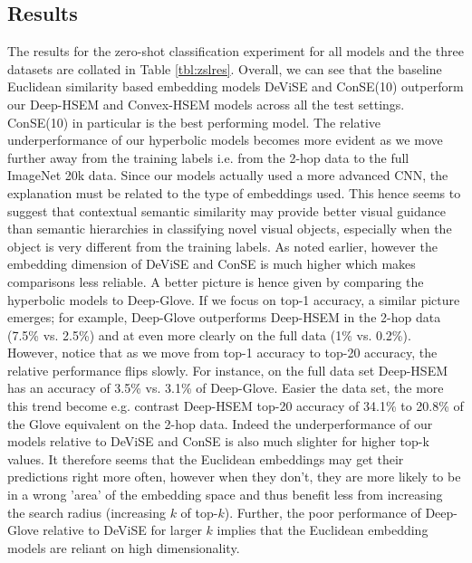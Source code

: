 \documentclass[12pt]{report}
\begin{document}
\subsection{Results}
The results for the zero-shot classification experiment for all models and the three datasets are collated in Table \ref{tbl:zslres}. Overall, we can see that the baseline Euclidean similarity based embedding models DeViSE and ConSE(10) outperform our Deep-HSEM and Convex-HSEM models across all the test settings. ConSE(10) in particular is the best performing model. The relative underperformance of our hyperbolic models becomes more evident as we move further away from the training labels i.e. from the 2-hop data to the full ImageNet 20k data. Since our models actually used a more advanced CNN, the explanation must be related to the type of embeddings used. This hence seems to suggest that contextual semantic similarity may provide better visual guidance than semantic hierarchies in classifying novel visual objects, especially when the object is very different from the training labels. As noted earlier, however the embedding dimension of DeViSE and ConSE is much higher which makes comparisons less reliable. A better picture is hence given by comparing the hyperbolic models to Deep-Glove. If we focus on top-1 accuracy, a similar picture emerges; for example, Deep-Glove outperforms Deep-HSEM in the 2-hop data (7.5\% vs. 2.5\%) and at even more clearly on the full data (1\% vs. 0.2\%). However, notice that as we move from top-1 accuracy to top-20 accuracy, the relative performance flips slowly. For instance, on the full data set Deep-HSEM has an accuracy of 3.5\% vs. 3.1\% of Deep-Glove. Easier the data set, the more this trend become e.g. contrast Deep-HSEM top-20 accuracy of 34.1\% to 20.8\% of the Glove equivalent on the 2-hop data. Indeed the underperformance of our models relative to DeViSE and ConSE is also much slighter for higher top-k values. It therefore seems that the Euclidean embeddings may get their predictions right more often, however when they don't, they are more likely to be in a wrong 'area' of the embedding space and thus benefit less from increasing the search radius (increasing $k$ of top-$k$). Further, the poor performance of Deep-Glove relative to DeViSE for larger $k$ implies that the Euclidean embedding models are reliant on high dimensionality.
\end{document}
